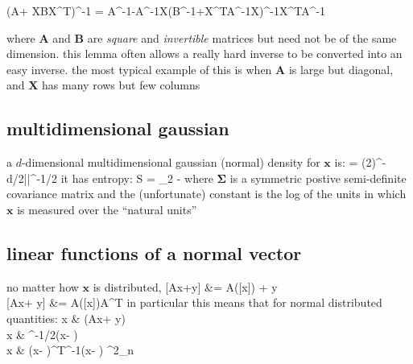 \documentclass[11pt,reqno,intlimits]{article}
\newcommand{\xx}{{\mathbf x}}
\newcommand{\yy}{{\mathbf y}}
\newcommand{\BB}{{\mathbf B}}
\newcommand{\XX}{{\mathbf X}}
\renewcommand{\AA}{{\mathbf A}}
\newcommand{\ZZ}{{\mathbf 0}}
\newcommand{\II}{{\mathbf I}}
\newcommand{\mmm}{{\boldsymbol \mu}}
\newcommand{\Sm}{{\boldsymbol \Sigma}}
\begin{document}
\beq
(\AA + \XX\BB\XX^T)^{-1} = 
\AA^{-1}-\AA^{-1}\XX(\BB^{-1}+\XX^T\AA^{-1}\XX)^{-1}\XX^T\AA^{-1}
\eeq

where $\AA$ and $\BB$ are {\em square} and {\em invertible} matrices
but need not be of the same dimension.
this lemma often
allows a really hard inverse to be converted into an easy inverse. the
most typical example of this is when $\AA$ is large but diagonal, and
$\XX$ has many rows but few columns

\newpage
\subsection{multidimensional gaussian}
a $d$-dimensional multidimensional gaussian (normal) density for $\xx$
is:
\beq
\normal{\mmm}{\Sm} = 
(2\pi)^{-d/2}|\Sm|^{-1/2}
\exp\left[-\frac{1}{2}(\xx-\mmm)^T\Sm^{-1}(\xx-\mmm)\right]
\eeq
it has entropy:
\beq
S = \log_2\left[ (2\pi e)^d|\Sm| \right] \: - 
\quad {}
\eeq
where $\Sm$ is a symmetric postive semi-definite covariance matrix and
the (unfortunate) constant is the log of the units in which $\xx$ is
measured over the ``natural units''

\subsection{linear functions of a normal vector}
no matter how $\xx$ is distributed,
\beqa
{}[\AA\xx+\yy] &= \AA([\xx]) + \yy \\
[\AA\xx + \yy] &= \AA([\xx])\AA^T
\eeqa
in particular this means that for normal distributed quantities:
\beqa
\xx \distrib \normal{\mmm}{\Sm} &\Rightarrow
(\AA\xx + \yy) \distrib \normal{\AA\mmm + \yy}{\AA \Sm \AA^T} \\
\xx \distrib \normal{\mmm}{\Sm} &\Rightarrow
\Sm^{-1/2}(\xx - \mmm) \distrib \normal{\ZZ}{\II} \\
\xx \distrib \normal{\mmm}{\Sm} &\Rightarrow
(\xx - \mmm)^T\Sm^{-1}(\xx - \mmm) \distrib \chi^2_n 
\eeqa
\end{document}
